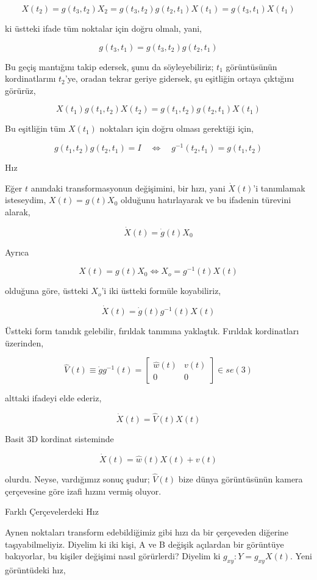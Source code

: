 \documentclass[12pt,fleqn]{article}\usepackage{../../common}
\begin{document}
$$ X(t_2) = g(t_3,t_2)X_2 = g(t_3,t_2)g(t_2,t_1)X(t_1) = g(t_3,t_1)X(t_1) $$

ki üstteki ifade tüm noktalar için doğru olmalı, yani,

$$ g(t_3,t_1) = g(t_3,t_2)g(t_2,t_1) $$

Bu geçiş mantığını takip edersek, şunu da söyleyebiliriz; $t_1$
görüntüsünün kordinatlarını $t_2$'ye, oradan tekrar geriye gidersek, şu
eşitliğin ortaya çıktığını görürüz,

$$ X(t_1) g(t_1,t_2)X(t_2) = g(t_1,t_2) g(t_2,t_1) X(t_1)$$

Bu eşitliğin tüm $X(t_1)$ noktaları için doğru olması gerektiği için, 

$$ g(t_1,t_2)g(t_2,t_1) = I 
\quad \Leftrightarrow \quad g^{-1}(t_2,t_1) = g(t_1,t_2)
$$

Hız

Eğer $t$ anındaki transformasyonun değişimini, bir hızı, yani
$\dot{X}(t)$'i tanımlamak isteseydim, $X(t) = g(t)X_0$ olduğunu
hatırlayarak ve bu ifadenin türevini alarak,

$$ \dot{X}(t) = \dot{g}(t)X_0 $$

Ayrıca

$$ X(t) = g(t)X_0 \iff X_o = g^{-1}(t)X(t) $$

olduğuna göre, üstteki $X_o$'i iki üstteki formüle koyabiliriz,

$$ \dot{X}(t) = \dot{g}(t)g^{-1}(t)X(t) $$

Üstteki form tanıdık gelebilir, fırıldak tanımına yaklaştık. Fırıldak
kordinatları üzerinden,

$$ \hat{V}(t) \equiv \dot{g}g^{-1}(t) = 
\left[\begin{array}{rrr}
\hat{w}(t) & v(t) \\ 0 & 0
\end{array}\right] \in se(3)
$$

alttaki ifadeyi elde ederiz, 

$$ \dot{X}(t) = \hat{V}(t)X(t) $$

Basit 3D kordinat sisteminde

$$ \dot{X}(t) = \hat{w}(t)X(t) + v(t) $$

olurdu. Neyse, vardığımız sonuç şudur; $\hat{V}(t)$ bize dünya görüntüsünün
kamera çerçevesine göre izafi hızını vermiş oluyor.

Farklı Çerçevelerdeki Hız

Aynen noktaları transform edebildiğimiz gibi hızı da bir çerçeveden
diğerine taşıyabilmeliyiz. Diyelim ki iki kişi, A ve B değişik açılardan
bir görüntüye bakıyorlar, bu kişiler değişimi nasıl görürlerdi? 
Diyelim ki $g_{xy}: Y = g_{xy}X(t)$. Yeni görüntüdeki hız, 
\end{document}
